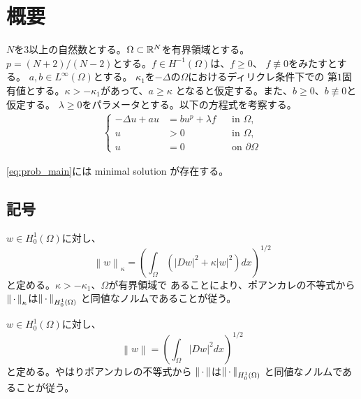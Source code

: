 \section{概要}

$N$を$3$以上の自然数とする。$\Omega \subset \mathbb{R}^N$を有界領域とする。
$p = (N+2)/(N-2)$とする。$f \in H^{-1}(\Omega)$は、$f \geq 0$、
$f \not \equiv 0$をみたすとする。
$a, b \in L^\infty(\Omega)$とする。
$\kappa_1$を$-\Delta$の$\Omega$におけるディリクレ条件下での
第$1$固有値とする。$\kappa > - \kappa_1$があって、$a \geq \kappa$
となると仮定する。また、$b \geq 0$、$b \not \equiv 0$と仮定する。
$\lambda \geq 0$をパラメータとする。以下の方程式を考察する。
\begin{align}
 \left\{
 \begin{aligned}
  -\Delta u + a u &= b u^p + \lambda f  & &\text{in~} \Omega,  \\
  u &> 0 & &\text{in~} \Omega, \\
  u &= 0 & &\text{on~} \partial\Omega
 \end{aligned}
 \right. \tag*{$(\star)_\lambda$} \label{eq:prob_main}
\end{align}

\begin{thm} \label{thm:minimal_solution}
 \ref{eq:prob_main}には minimal solution が存在する。
\end{thm}

\subsection{記号}

$w \in H_0^1(\Omega)$に対し、
\[
 \left\| w \right\|_\kappa = \left(\int_\Omega \left( \lvert Dw \rvert^2 +
 \kappa \lvert w \rvert^2 \right) dx\right)^{1/2}
\]
と定める。$\kappa > -\kappa_1$、$\Omega$が有界領域で
あることにより、ポアンカレの不等式から
$\left\|\, \cdot \, \right\|_\kappa$は$\left\|\, \cdot \, \right\|_{H_0^1(\Omega)}$
と同値なノルムであることが従う。

$w \in H_0^1(\Omega)$に対し、
\[
 \left\| w \right\| = \left(\int_\Omega \lvert Dw \rvert^2 dx\right)^{1/2}
\]
と定める。やはりポアンカレの不等式から
$\left\|\, \cdot \, \right\|$は$\left\|\, \cdot \, \right\|_{H_0^1(\Omega)}$
と同値なノルムであることが従う。